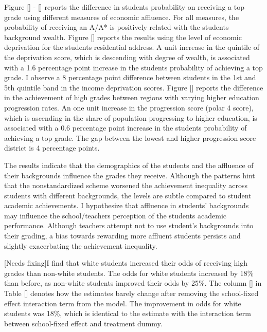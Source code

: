 Figure [] - [] reports the difference in students probability on receiving a top grade using different measures of economic affluence. For all measures, the probability of receiving an A/A* is positively related with the students background wealth. Figure [] reports the results using the level of economic deprivation for the students residential address. A unit increase in the quintile of the deprivation score, which is descending with degree of wealth, is associated with a 1.6 percentage point increase in the students probability of achieving a top grade. I observe a 8 percentage point difference between students in the 1st and 5th quintile band in the income deprivation scores. Figure [] reports the difference in the achievement of high grades between regions with varying higher education progression rates. An one unit increase in the progression score (polar 4 score), which is ascending in the share of population progressing to higher education,  is associated with a 0.6 percentage point increase in the students probability of achieving a top grade. The gap between the lowest and higher progression score district is 4 percentage points. 

The results indicate that the demographics of the students and the affluence of their backgrounds influence the grades they receive. Although the patterns hint that the nonstandardized scheme worsened the achievement inequality across students with different backgrounds, the levels are subtle compared to student academic achievements. I hypothesize that affluence in students' backgrounds may influence the school/teachers perception of the students academic performance. Although teachers attempt not to use student's backgrounds into their grading, a bias towards rewarding more affluent students persists and slightly exacerbating the achievement inequality. 

[Needs fixing]I find that white students increased their odds of receiving high grades than non-white students. The odds for white students increased by 18\% than before, as non-white students improved their odds by 25\%. The column [] in Table [] denotes how the estimates barely change after removing the school-fixed effect interaction term from the model. The improvement in odds for white students was 18\%, which is identical to the estimate with the interaction term between school-fixed effect and treatment dummy. 



